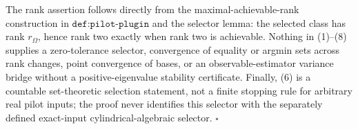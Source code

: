 The rank assertion follows directly from the maximal-achievable-rank construction in \(\texttt{def:pilot-plugin}\) and the selector lemma: the selected class has rank \(r_\Omega\), hence rank two exactly when rank two is achievable.  Nothing in (1)--(8) supplies a zero-tolerance selector, convergence of equality or argmin sets across rank changes, point convergence of bases, or an observable-estimator variance bridge without a positive-eigenvalue stability certificate.  Finally, (6) is a countable set-theoretic selection statement, not a finite stopping rule for arbitrary real pilot inputs; the proof never identifies this selector with the separately defined exact-input cylindrical-algebraic selector. \(\square\)